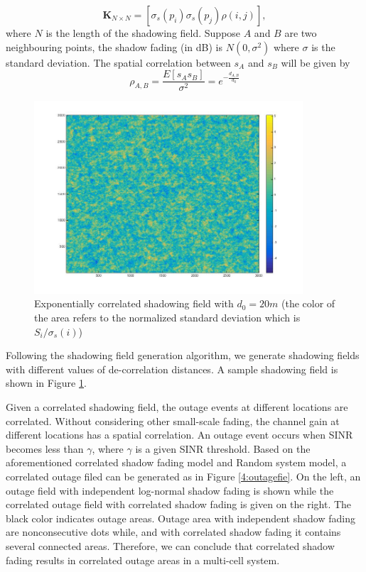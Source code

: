  \begin{equation}
 \mathbf{K}_{N\times N} = [ \sigma_{s}(p_{i})\sigma_{s}(p_{j})\rho(i,j)],
 \label{correlationmatrix}
 \end{equation}
 where $N$ is the length of the shadowing field. Suppose $A$ and $B$ are two neighbouring points, the shadow fading (in dB) is $N(0,\sigma^2)$ where $\sigma$ is the standard deviation. The spatial correlation between $s_{A}$ and $s_{B}$ will be given by 
 \begin{equation}
 \rho_{A,B} = \frac{E[s_{A}s_{B}]}{\sigma^2} =e^{-\frac{d_{A,B}}{d_{0}}}
 \end{equation}
 \begin{figure}
 \centering
 \includegraphics[width = 10cm]{ShadowFieldDeCorr20.jpg}
 \caption{Exponentially correlated shadowing field with $d_{0} = 20m$ (the color of the area refers to the normalized standard deviation which is $S_{i}/\sigma_{s}(i)$)}

 \label{ch4:shadowingfield}
 \end{figure}

 Following the shadowing field generation algorithm, we generate shadowing fields with different values of de-correlation distances. A sample shadowing field is shown in Figure \ref{ch4:shadowingfield}.

 \par Given a correlated shadowing field, the outage events at different locations are correlated. Without considering other small-scale fading, the channel gain at different locations has a spatial correlation. An outage event occurs when SINR becomes less than $\gamma$, where $\gamma$ is a given SINR threshold. Based on the aforementioned correlated shadow fading model and Random system model, a correlated outage filed can be generated as in Figure \ref{4:outagefie}. On the left, an outage field with independent log-normal shadow fading is shown while the correlated outage field with correlated shadow fading is given on the right. The black color indicates outage areas. Outage area with independent shadow fading are nonconsecutive dots while, and with correlated shadow fading it contains several connected areas. Therefore, we can conclude that correlated shadow fading results in correlated outage areas in a multi-cell system.

